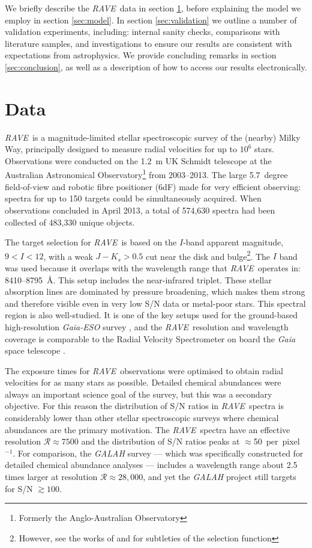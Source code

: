 \documentclass[preprint,trackchanges]{aastex}
\newcommand{\project}[1]{\textsl{#1}}
\newcommand{\acronym}[1]{{\small{#1}}}
\newcommand{\rave}{\project{\acronym{RAVE}}}
\begin{document}
We briefly describe the \rave\ data in section \ref{sec:data}, before explaining
the model we employ in section \ref{sec:model}.  In section \ref{sec:validation}
we outline a number of validation experiments, including: internal sanity checks,
comparisons with literature samples, and investigations to ensure our results
are consistent with expectations from astrophysics.  We provide concluding
remarks in section \ref{sec:conclusion}, as well as a description of how to
access our results electronically.


\section{Data}
\label{sec:data}


\rave\ is a magnitude-limited stellar spectroscopic survey of the (nearby) Milky Way,
principally designed to measure radial velocities for up to $10^6$ stars.
Observations were conducted on the 1.2~m UK Schmidt telescope at the Australian 
Astronomical Observatory\footnote{Formerly the Anglo-Australian Observatory} from 
2003--2013.  The large 5.7~degree field-of-view and robotic fibre positioner (6dF)
made for very efficient observing: spectra for up to 150 targets could be 
simultaneously acquired.  When observations concluded in April 2013, a total of 
574,630 spectra had been collected of 483,330 unique objects. 


The target selection for \rave\ is based on the $I$-band apparent magnitude,
$9 < I < 12$, with a weak $J - K_s > 0.5$ cut near the disk and bulge\footnote{
However, see the works of \citet{Kunder_2016} and \citet{Kordopatis_2013} for 
subtleties of the selection function}.
The $I$ band was used because it overlaps with the wavelength range 
that \rave\ operates in:  8410--8795~\AA.  This setup includes the  
near-infrared triplet.  These stellar absorption lines are dominated by pressure 
broadening, which makes them strong and therefore visible even in very low S/N data
or metal-poor stars.  This spectral region is also well-studied.  It is one of the
key setups used for the ground-based high-resolution \project{Gaia-ESO} survey
\citep{Gilmore_2012,Randich_2013}, and the \rave\ resolution and wavelength
coverage is comparable to the Radial Velocity Spectrometer on board the \project{Gaia}
space telescope \citep{Recio-Blanco_2016}.


The exposure times for \rave\ observations were optimised to obtain radial 
velocities for as many stars as possible.  Detailed chemical abundances were
always an important science goal of the survey, but this was a secondary objective.  
For this reason the distribution of S/N ratios in \rave\ spectra is considerably 
lower than other stellar spectroscopic surveys where chemical abundances are the 
primary motivation.  The \rave\ spectra have an effective resolution 
$\mathcal{R} \approx 7500$ and the distribution of S/N ratios peaks at 
$\approx$50~per~pixel$^{-1}$.  For comparison, the \project{GALAH} survey 
\citep{DeSilva_2015} --- which was specifically constructed for detailed chemical 
abundance analyses --- includes a wavelength range about 2.5 times larger at 
resolution $\mathcal{R} \approx 28,000$, and yet the \project{GALAH} project still 
targets for S/N $\gtrsim100$.
\end{document}
